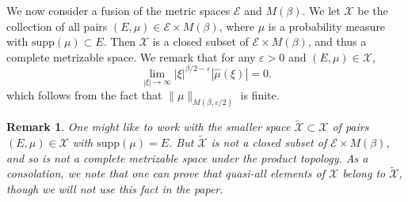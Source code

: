 \documentclass[12pt,reqno]{article}
\numberwithin{equation}{section}
\newtheorem{theorem}{Theorem}
\newtheorem*{remark}{Remark}
\begin{document}
We now consider a fusion of the metric spaces $\mathcal{E}$ and $M(\beta)$. We let $\mathcal{X}$ be the collection of all pairs $(E,\mu) \in \mathcal{E} \times M(\beta)$, where $\mu$ is a probability measure with $\text{supp}(\mu) \subset E$. Then $\mathcal{X}$ is a closed subset of $\mathcal{E} \times M(\beta)$, and thus a complete metrizable space. We remark that for any $\varepsilon > 0$ and $(E,\mu) \in \mathcal{X}$,
%
\begin{equation} \label{equationGFSCSC4}
    \lim_{|\xi| \to \infty} |\xi|^{\beta/2 - \varepsilon} |\widehat{\mu}(\xi)| = 0.
\end{equation}
%
which follows from the fact that $\| \mu \|_{M(\beta,\varepsilon/2)}$ is finite.
\begin{comment}

\begin{theorem}
    $\mathcal{X}$ is a closed subset of $\mathcal{E} \times M(\beta)$.
\end{theorem}
\begin{proof}
    Suppose $\{ (E_k,\mu_k) \}$ is a sequence of elements of $\mathcal{X}$ converging to some tuple $(E,\mu) \in \mathcal{E} \times M(\beta)$. Fix $\varepsilon > 0$. Since $E_k \to E$ in the Hausdorff dimension, there exists $k_0$ such that for $k \geq k_0$, $E_k \subset E(\varepsilon)$. Since $\mu_k \to \mu$ weakly, this implies that $\mu$ is a probability measure, and that $\text{supp}(\mu) \subset E(\varepsilon)$. Taking $\varepsilon \to 0$ shows that $\text{supp}(\mu) \subset E$. Again for a fixed $\varepsilon > 0$, applying the triangle inequality and the reverse triangle inequality combined with \eqref{equationGFSCSC4} applied to $\mu_k$, we conclude
    \[ \lim_{|\xi| \to \infty} |\xi|^{\beta/2 - \varepsilon} |\widehat{\mu}(\xi)| = \lim_{|\xi| \to \infty} |\xi|^{\beta/2 - \varepsilon} |\widehat{\mu}(\xi) - \widehat{\mu_k}(\xi)| \leq \| \mu - \mu_k \|_{M(\beta,\varepsilon)}. \]
    Taking $k \to \infty$ shows that
    \[ \lim_{|\xi| \to \infty} |\xi|^{\beta/2 - \varepsilon} |\widehat{\mu}(\xi)| = 0, \]
    which completes the proof.
\end{proof}

\end{comment}

\begin{remark}
    One might like to work with the smaller space $\tilde{\mathcal{X}} \subset \mathcal{X}$ of pairs $(E,\mu) \in \mathcal{X}$ with $\text{supp}(\mu) = E$. But $\tilde{\mathcal{X}}$ is not a closed subset of $\mathcal{E} \times M(\beta)$, and so is not a complete metrizable space under the product topology. As a consolation, we note that one can prove that quasi-all elements of $\mathcal{X}$ belong to $\tilde{\mathcal{X}}$, though we will not use this fact in the paper.
\end{remark}
\end{document}
